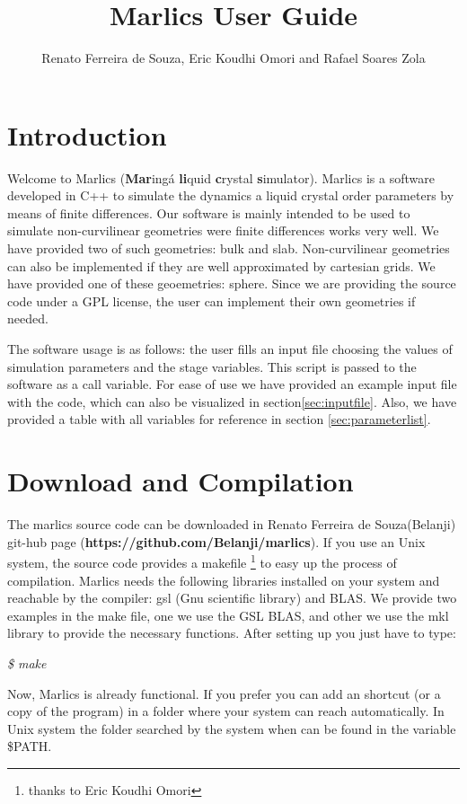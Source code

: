 \documentclass{article}
\title{Marlics User Guide}
\author{Renato Ferreira de Souza, Eric Koudhi Omori and Rafael Soares Zola}
\newcommand{\consoleline}[2][0.5cm]
{\vspace{#1}
\textit{{#2}}
\vspace{#1}
}
\begin{document}
\maketitle

\section{Introduction}
  
Welcome to Marlics (\textbf{Mar}ingá \textbf{li}quid \textbf{c}rystal
\textbf{s}imulator). Marlics is a software developed in C++ to
simulate the dynamics a liquid crystal order parameters by means of
finite differences. Our software is mainly intended to be used to
simulate non-curvilinear geometries were finite differences works very
well. We have provided two of such geometries: bulk and slab.
Non-curvilinear geometries can also be implemented if they are well
approximated by cartesian grids. We have provided one of these
geoemetries: sphere.  Since we are providing the source code under a
GPL license, the user can implement their own geometries if needed.

The software usage is as follows: the user fills an input file choosing the
values of simulation parameters and the stage variables. This script
is passed to the software as a call variable. For ease of use we have
provided an example input file with the code, which can also be
visualized in section\ref{sec:inputfile}. Also, we have provided a
table with all variables for reference in section
\ref{sec:parameterlist}.


\section{Download and Compilation}

The marlics source code can be downloaded in Renato Ferreira de
Souza(Belanji) git-hub page
(\textbf{https://github.com/Belanji/marlics}). If you use an Unix
system, the source code provides a makefile \footnote{thanks to Eric
  Koudhi Omori} to easy up the process of compilation.  Marlics needs
the following libraries installed on your system and reachable by the
compiler: gsl (Gnu scientific library) and BLAS. We provide two
examples in the make file, one we use the GSL BLAS, and other we use
the mkl library to provide the necessary functions.  After setting up
you just have to type:

\consoleline{\$ make}

Now, Marlics is already functional. If you prefer you can add an
shortcut (or a copy of the program) in a folder where your system can
reach automatically. In Unix system the folder searched by the system
when can be found in the variable \$PATH.
\end{document}
